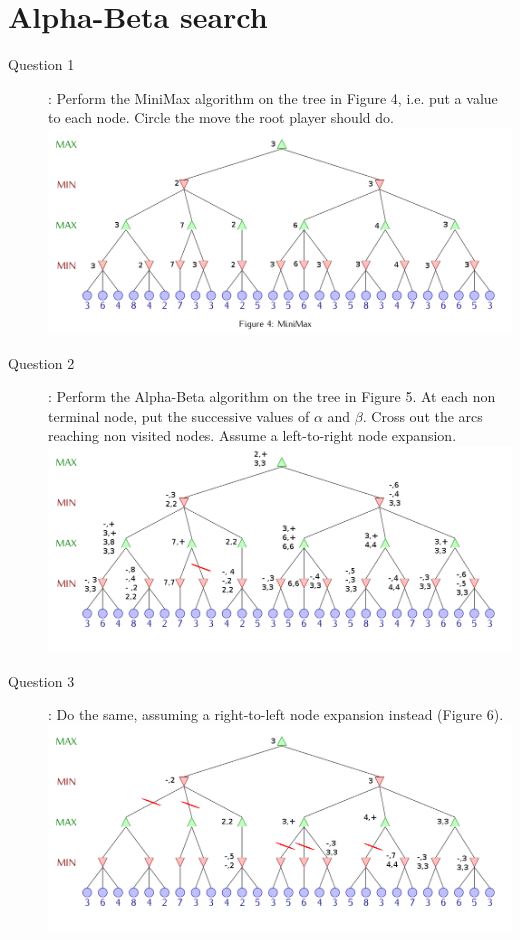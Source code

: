 \section{Alpha-Beta search}
\begin{description}
\item[Question 1]: Perform the MiniMax algorithm on the tree in Figure 4, i.e. put a value to each node. Circle the move the root player should do.\\
\includegraphics[scale=0.4]{minimax-fig4.png}
\item[Question 2]: Perform the Alpha-Beta algorithm on the tree in Figure 5. At each non terminal node, put the successive values of $\alpha$ and $\beta$. Cross out the arcs reaching non visited nodes. Assume a left-to-right node expansion.\\
\includegraphics[scale=0.4]{minimax-fig5.png}
\item[Question 3]: Do the same, assuming a right-to-left node expansion instead (Figure 6).\\
\includegraphics[scale=0.4]{minimax-fig6.png}

\end{description}
